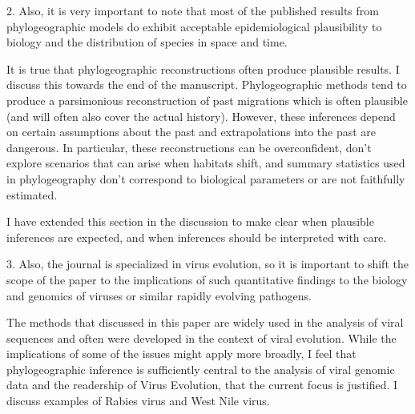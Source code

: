 \documentclass[11pt, oneside]{article}   	%
\newcommand{\response}[1]{{\color{black}{\bf Response:} #1}}
\begin{document}
2. Also, it is very important to note that most of the published results from phylogeographic models do exhibit acceptable epidemiological plausibility to biology and the distribution of species in space and time.

\response{It is true that phylogeographic reconstructions often produce plausible results. I discuss this towards the end of the manuscript. Phylogeographic methods tend to produce a parsimonious reconstruction of past migrations which is often plausible (and will often also cover the actual history). However, these inferences depend on certain assumptions about the past and extrapolations into the past are dangerous. In particular, these reconstructions can be overconfident, don't explore scenarios that can arise when habitats shift, and summary statistics used in phylogeography don't correspond to biological parameters or are not faithfully estimated.

I have extended this section in the discussion to make clear when plausible inferences are expected, and when inferences should be interpreted with care.
}

3. Also, the journal is specialized in virus evolution, so it is important to shift the scope of the paper to the implications of such quantitative findings to the biology and genomics of viruses or similar rapidly evolving pathogens.

\response{The methods that discussed in this paper are widely used in the analysis of viral sequences and often were developed in the context of viral evolution. While the implications of some of the issues might apply more broadly, I feel that phylogeographic inference is sufficiently central to the analysis of viral genomic data and the readership of Virus Evolution, that the current focus is justified.
I discuss examples of Rabies virus and West Nile virus. }
\end{document}
